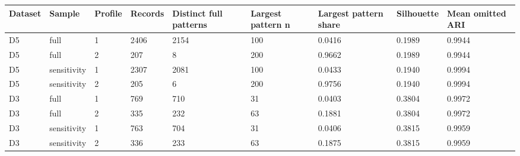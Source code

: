 \begin{tabular}{lllllllll}
\toprule
Dataset & Sample & Profile & Records & Distinct full patterns & Largest pattern n & Largest pattern share & Silhouette & Mean omitted ARI \\
\midrule
D5 & full & 1 & 2406 & 2154 & 100 & 0.0416 & 0.1989 & 0.9944 \\
D5 & full & 2 & 207 & 8 & 200 & 0.9662 & 0.1989 & 0.9944 \\
D5 & sensitivity & 1 & 2307 & 2081 & 100 & 0.0433 & 0.1940 & 0.9994 \\
D5 & sensitivity & 2 & 205 & 6 & 200 & 0.9756 & 0.1940 & 0.9994 \\
D3 & full & 1 & 769 & 710 & 31 & 0.0403 & 0.3804 & 0.9972 \\
D3 & full & 2 & 335 & 232 & 63 & 0.1881 & 0.3804 & 0.9972 \\
D3 & sensitivity & 1 & 763 & 704 & 31 & 0.0406 & 0.3815 & 0.9959 \\
D3 & sensitivity & 2 & 336 & 233 & 63 & 0.1875 & 0.3815 & 0.9959 \\
\bottomrule
\end{tabular}
